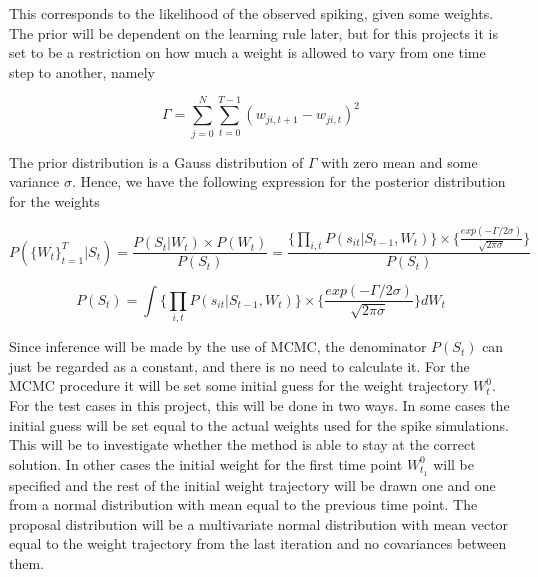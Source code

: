 This corresponds to the likelihood of the observed spiking, given some weights. The prior will be dependent on the learning rule later, but for this projects it is set to be a restriction on how much a weight is allowed to vary from one time step to another, namely

\begin{equation}
    \Gamma = \sum_{j=0}^{N} \sum_{t=0}^{T-1} (w_{ji,t+1}-w_{ji,t})^2
\end{equation}

The prior distribution is a Gauss distribution of $\Gamma$ with zero mean and some variance $\sigma$. Hence, we have the following expression for the posterior distribution for the weights

\begin{equation}
        P(\{W_t\}_{t=1}^{T}|S_t) = \frac{P(S_t|W_t)\times P(W_t)}{P(S_t)} = \frac{\Big\{\prod_{i,t} P(s_{it}|S_{t-1}, W_t)\Big\} \times \Big\{\frac{exp(-\Gamma /2\sigma)}{\sqrt{2\pi \sigma}}\Big\}}{P(S_t)} 
\end{equation}

\begin{equation}
        P(S_t) = \int \Big\{\prod_{i,t} P(s_{it}|S_{t-1}, W_t)\Big\} \times \Big\{\frac{exp(-\Gamma /2\sigma)}{\sqrt{2\pi \sigma}}\Big\} d{W_t}
\end{equation}

Since inference will be made by the use of MCMC, the denominator $P(S_t)$ can just be regarded as a constant, and there is no need to calculate it. For the MCMC procedure it will be set some initial guess for the weight trajectory $W_t^0$. For the test cases in this project, this will be done in two ways. In some cases the initial guess will be set equal to the actual weights used for the spike simulations. This will be to investigate whether the method is able to stay at the correct solution. In other cases the initial weight for the first time point $W_{t_1}^0$ will be specified and the rest of the initial weight trajectory will be drawn one and one from a normal distribution with mean equal to the previous time point. The proposal distribution will be a  multivariate normal distribution with mean vector equal to the weight trajectory from the last iteration and no covariances between them. 











\cleardoublepage